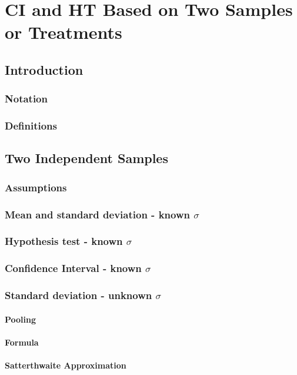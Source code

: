 \chapter{CI and HT Based on Two Samples or Treatments}  %

\section{Introduction}  %
    \subsection{Notation}  %
    \subsection{Definitions}  %

\section{Two Independent Samples}  %
    \subsection{Assumptions}  %
    \subsection{Mean and standard deviation - known $\sigma$}  %
    \subsection{Hypothesis test - known $\sigma$}  %
    \subsection{Confidence Interval - known $\sigma$}  %
    \subsection{Standard deviation - unknown $\sigma$}  %
        \subsubsection{Pooling}  %
        \subsubsection{Formula}  %
        \subsubsection{Satterthwaite Approximation}  %
